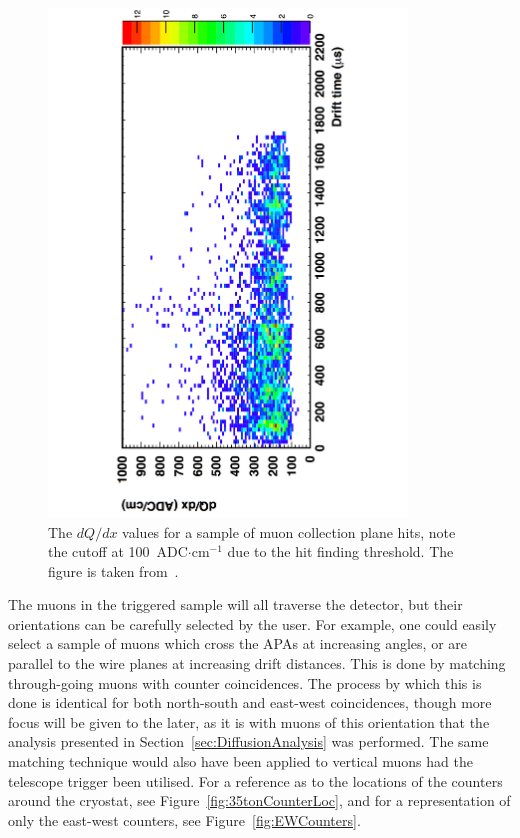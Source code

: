 \begin{figure}
  \centering
  \includegraphics[width=0.85\textwidth]{TingjunLifetime}
  \caption[$dQ/dx$ in the 35 ton as a function of drift time]
          {The $dQ/dx$ values for a sample of muon collection plane hits, note the cutoff at 100~ADC$\cdot$cm$^{-1}$ due to the hit finding threshold. The figure is taken from~\citep{TingjunLifetime}.}
  \label{fig:TingjunLifetime}
\end{figure}  

The muons in the triggered sample will all traverse the detector, but their orientations can be carefully selected by the user. For example, one could easily select a sample of muons which cross the APAs at increasing angles, or are parallel to the wire planes at increasing drift distances. This is done by matching through-going muons with counter coincidences. The process by which this is done is identical for both north-south and east-west coincidences, though more focus will be given to the later, as it is with muons of this orientation that the analysis presented in Section~\ref{sec:DiffusionAnalysis} was performed. The same matching technique would also have been applied to vertical muons had the telescope trigger been utilised. For a reference as to the locations of the counters around the cryostat, see Figure~\ref{fig:35tonCounterLoc}, and for a representation of only the east-west counters, see Figure~\ref{fig:EWCounters}. \\

